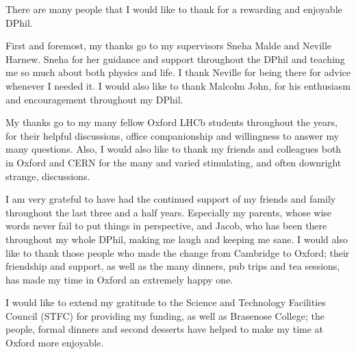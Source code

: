 
There are many people that I would like to thank for a rewarding and enjoyable DPhil.

First and foremost, my thanks go to my supervisors Sneha Malde and Neville Harnew. Sneha for her guidance and support throughout the DPhil and teaching me so much about both physics and life. I thank Neville for being there for advice whenever I needed it. I would also like to thank Malcolm John, for his enthusiasm and encouragement throughout my DPhil.

My thanks go to my many fellow Oxford LHCb students throughout the years, for their helpful discussions, office companionship and willingness to answer my many questions. Also, I would also like to thank my friends and colleagues both in Oxford and CERN for the many and varied stimulating, and often downright strange, discussions.

I am very grateful to have had the continued support of my friends and family throughout the last three and a half years. Especially my parents, whose wise words never fail to put things in perspective, and Jacob, who has been there throughout my whole DPhil, making me laugh and keeping me sane. I would also like to thank those people who made the change from Cambridge to Oxford; their friendship and support, as well as the many dinners, pub trips and tea sessions, has made my time in Oxford an extremely happy one.

I would like to extend my gratitude to the Science and Technology Facilities Council (STFC) for providing my funding, as well as Brasenose College; the people, formal dinners and second desserts have helped to make my time at Oxford more enjoyable.
